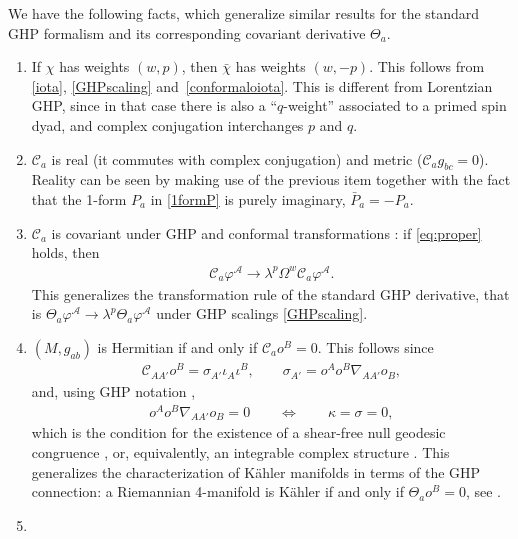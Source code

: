 \documentclass[10pt,a4paper]{amsart}
\numberwithin{equation}{section}
\begin{document}
\begin{Remark}%
We have the following facts, which generalize similar results for the standard GHP formalism and its corresponding covariant derivative $\Theta_{a}$.
\begin{enumerate}\itemsep=0pt
\item
If $\chi$ has weights $(w,p)$, then $\bar\chi$ has weights $(w,-p)$. This follows from \eqref{iota}, \eqref{GHPscaling} and~\eqref{conformaloiota}.
This is different from Lorentzian GHP, since in that case there is also a ``$q$-weight'' associated to a primed spin dyad, and complex conjugation interchanges $p$ and $q$.
\item
$\mathcal{C}_{a}$ is real (it commutes with complex conjugation) and metric ($\mathcal{C}_{a}g_{bc}=0$).
Reality can be seen by making use of the previous item together with the fact that the 1-form $P_{a}$ in \eqref{1formP} is purely imaginary, $\bar{P}_{a}=-P_{a}$.
\item
$\mathcal{C}_{a}$ is covariant under GHP and conformal transformations \cite[Section 2.3]{araneda2021conformal}: if \eqref{eq:proper} holds, then
\begin{align*}
 \mathcal{C}_{a}\varphi^{\mathcal{A}} \to \lambda^p \Omega^w \mathcal{C}_{a}\varphi^{\mathcal{A}}.
\end{align*}
This generalizes the transformation rule of the standard GHP derivative, that is $\Theta_{a}\varphi^{\mathcal{A}} \to \lambda^p\Theta_{a}\varphi^{\mathcal{A}}$ under GHP scalings \eqref{GHPscaling}.
\item
$(M,g_{ab})$ is Hermitian if and only if $\mathcal{C}_{a}o^{B}=0$. This follows since
\begin{align*}
\mathcal{C}_{AA'}o^{B} = \sigma_{A'}\iota_{A}\iota^{B}, \qquad
\sigma_{A'}=o^{A}o^{B}\nabla_{AA'}o_{B},
\end{align*}
and, using GHP notation \cite{PR:I},
\begin{align}\label{SFR}
o^{A}o^{B}\nabla_{AA'}o_{B} = 0 \qquad \Leftrightarrow \qquad \kappa=\sigma=0,
\end{align}
which is the condition for the existence of a shear-free null geodesic congruence \cite[equation~(7.3.1)]{PR:II}, or, equivalently, an integrable complex structure \cite[Section 2.4]{araneda2021conformal}.
This generalizes the characterization of K\"ahler manifolds in terms of the GHP connection: a Riemannian 4-manifold is K\"ahler if and only if $\Theta_{a}o^{B}=0$, see \cite[Chapter~IV, Proposition~9.8]{lawson:michelsohn}.
\item

\end{enumerate}
\end{Remark}
\end{document}
